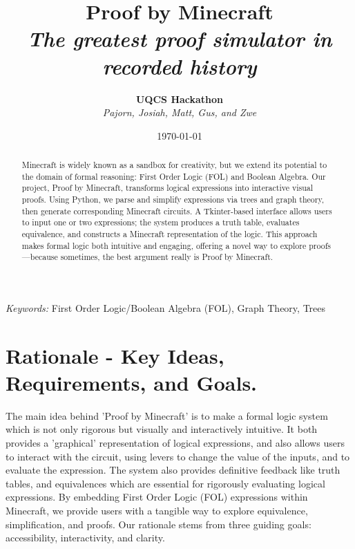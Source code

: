 \documentclass[11pt]{diazessay} %
\title{\textbf{Proof by Minecraft} \\ {\Large\itshape The greatest proof simulator in recorded history}} %
\author{\textbf{UQCS Hackathon} \\ \textit{Pajorn, Josiah, Matt, Gus, and Zwe}} %
\date{\today} %
\begin{document}
\maketitle %



\begin{abstract}
Minecraft is widely known as a sandbox for creativity, but we extend its potential to the domain of formal reasoning: First Order Logic (FOL) and Boolean Algebra. 
Our project, Proof by Minecraft, transforms logical expressions into interactive visual proofs. 
Using Python, we parse and simplify expressions via trees and graph theory, 
then generate corresponding Minecraft circuits. 
A Tkinter-based interface allows users to input one or two expressions; the system produces a truth table, evaluates equivalence, and constructs a Minecraft representation of the logic. This approach makes formal logic both intuitive and engaging, offering a novel way to explore proofs—because sometimes, the best argument really is Proof by Minecraft.
\end{abstract}

\hspace*{3.6mm}\textit{Keywords:} First Order Logic/Boolean Algebra (FOL), Graph Theory, Trees %

\vspace{30pt} %


\section*{Rationale - Key Ideas, Requirements, and Goals.}
The main idea behind 'Proof by Minecraft' is to make a formal logic system which is not only rigorous but visually and interactively intuitive.
It both provides a 'graphical' representation of logical expressions, and also allows users to interact with the circuit, using levers to change the value of the inputs, and to evaluate the expression.
The system also provides definitive feedback like truth tables, and equivalences which are essential for rigorously evaluating logical expressions.
By embedding First Order Logic (FOL) expressions within Minecraft, we provide users with a tangible way to explore equivalence, simplification, and proofs. Our rationale stems from three guiding goals: accessibility, interactivity, and clarity.
\end{document}
